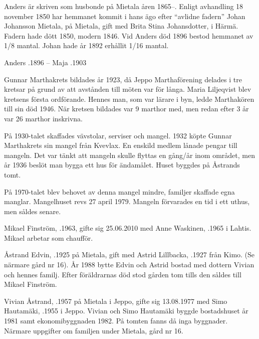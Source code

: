 Anders är skriven som husbonde på Mietala åren 1865--. Enligt avhandling 18 november 1850 har hemmanet kommit i hans ägo efter	``avlidne fadern'' Johan Johansson Mietala,  på Mietala, gift med Brita Stina Johansdotter,  i Härmä. Fadern hade dött 1850, modern 1846.	Vid Anders död 1896 bestod hemmanet av 1/8 mantal. Johan hade år 1892 erhållit 1/16 mantal.

Anders .1896  --  Maja .1903




Gunnar Marthakrets bildades år 1923, då Jeppo Marthaförening delades i tre kretsar på grund av att avstånden till möten var för långa. Maria Liljeqvist blev kretsens första ordförande. Hennes man, som var lärare i byn, ledde Marthakören till sin död 1946. När kretsen bildades var 9 marthor med, men redan efter 3 år var 26 marthor inskrivna.

På 1930-talet skaffades vävstolar, serviser och mangel. 1932 köpte Gunnar Marthakrets sin mangel från Kvevlax. En enskild medlem lånade pengar till mangeln. Det var tänkt att mangeln skulle flyttas en gång/år inom området, men år 1936 beslöt man bygga ett hus för ändamålet. Huset byggdes på Åstrands tomt.

På 1970-talet blev behovet av denna mangel mindre, familjer skaffade egna manglar. Mangelhuset revs 27 april 1979. Mangeln förvarades en tid i ett uthus, men såldes senare.






Mikael Finström, .1963, gifte sig 25.06.2010 med Anne Waskinen, .1965 i Lahtis. Mikael arbetar som chaufför.\jhvspace{}


Åstrand Edvin, .1925 på Mietala, gift med Astrid Lillbacka, .1927 från Kimo. (Se närmare gård nr 16). År 1988 bytte Edvin och Astrid bostad med dottern Vivian och hennes familj. Efter föräldrarnas död stod gården tom tills den såldes till Mikael Finström.


Vivian Åstrand, .1957  på Mietala i Jeppo, gifte sig 13.08.1977 med Simo Hautamäki, .1955 i Jeppo. Vivian och Simo Hautamäki byggde bostadshuset år 1981 samt ekonomibyggnaden 1982. På tomten fanns då inga byggnader. Närmare uppgifter om familjen under Mietala, gård nr 16.




